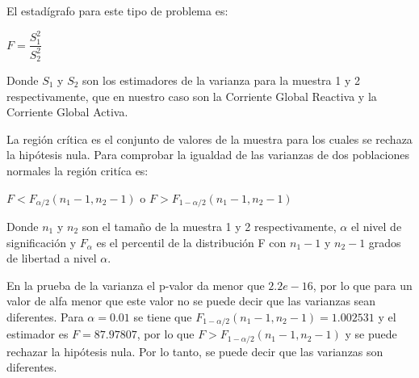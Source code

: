 \documentclass[a4paper,10pt,twocolumn]{report}
\begin{document}
		El estadígrafo para este tipo de problema es: 
		\begin{center}
			$F = \dfrac{S_1^2}{S_2^2}$
		\end{center}

		Donde $S_1$ y $S_2$ son los estimadores de la varianza para la muestra 1 y 2 respectivamente, que en nuestro caso son la Corriente Global Reactiva y la Corriente Global Activa.

		La región crítica es el conjunto de valores de la muestra para los cuales se rechaza la hipótesis nula. Para comprobar la igualdad de las varianzas de dos poblaciones normales la región critíca es:

		\begin{center}
			$F < F_{\alpha/2}(n_1 - 1, n_2 - 1)$ o $F > F_{1-\alpha/2}(n_1 - 1, n_2 - 1)$			
		\end{center}

		Donde $n_1$ y $n_2$ son el tamaño de la muestra 1 y 2 respectivamente, $\alpha$ el nivel de significación y $F_\alpha$ es el percentil de la distribución F con $n_1 - 1$ y $n_2-1$ grados de libertad a nivel $\alpha$.

		En la prueba de la varianza el p-valor da menor que $2.2e-16$, por lo que para un valor de alfa menor que este valor no se puede decir que las varianzas sean diferentes. Para $\alpha=0.01$ se tiene que $F_{1-\alpha/2}(n_1 - 1, n_2 - 1) = 1.002531$ y el estimador es $F=87.97807$, por lo que $F > F_{1-\alpha/2}(n_1 - 1, n_2 - 1)$ y se puede rechazar la hipótesis nula. Por lo tanto, se puede decir que las varianzas son diferentes.









\newpage
\newpage




\label{end}
\end{document}

